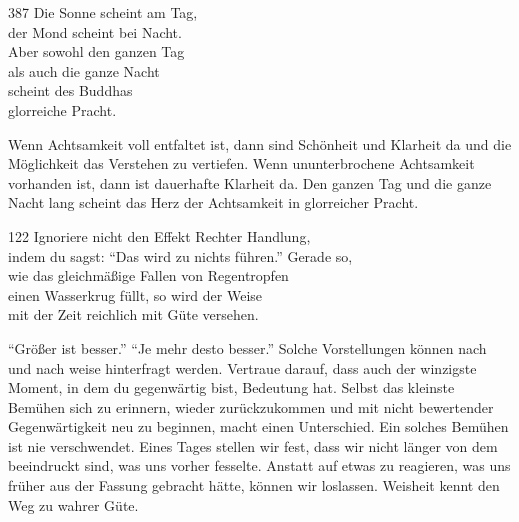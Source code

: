 
\begin{dhpVerse}{387}
\label{dhp-387}
Die Sonne scheint am Tag,\\ 
der Mond scheint bei Nacht.\\ 
Aber sowohl den ganzen Tag\\ 
als auch die ganze Nacht\\ 
scheint des Buddhas\\ 
glorreiche Pracht. 
\end{dhpVerse}

\begin{dhpRefl}

Wenn Achtsamkeit voll entfaltet ist, dann sind Schönheit und Klarheit da und
die Möglichkeit das Verstehen zu vertiefen. Wenn ununterbrochene Achtsamkeit
vorhanden ist, dann ist dauerhafte Klarheit da. Den ganzen Tag und die ganze
Nacht lang scheint das Herz der Achtsamkeit in glorreicher Pracht.

\end{dhpRefl}


\begin{dhpVerse}{122}
\label{dhp-122}
Ignoriere nicht den Effekt Rechter Handlung,\\ 
indem du sagst: “Das wird zu nichts führen.” Gerade so,\\ 
wie das gleichmäßige Fallen von Regentropfen\\ 
einen Wasserkrug füllt, so wird der Weise\\ 
mit der Zeit reichlich mit Güte versehen. 
\end{dhpVerse}

\begin{dhpRefl}

“Größer ist besser.” “Je mehr desto besser.” Solche Vorstellungen können nach
und nach weise hinterfragt werden. Vertraue darauf, dass auch der winzigste
Moment, in dem du gegenwärtig bist, Bedeutung hat. Selbst das kleinste Bemühen
sich zu erinnern, wieder zurückzukommen und mit nicht bewertender
Gegenwärtigkeit neu zu beginnen, macht einen Unterschied. Ein solches Bemühen
ist nie verschwendet. Eines Tages stellen wir fest, dass wir nicht länger von
dem beeindruckt sind, was uns vorher fesselte. Anstatt auf etwas zu reagieren,
was uns früher aus der Fassung gebracht hätte, können wir loslassen. Weisheit
kennt den Weg zu wahrer Güte.

\end{dhpRefl}

